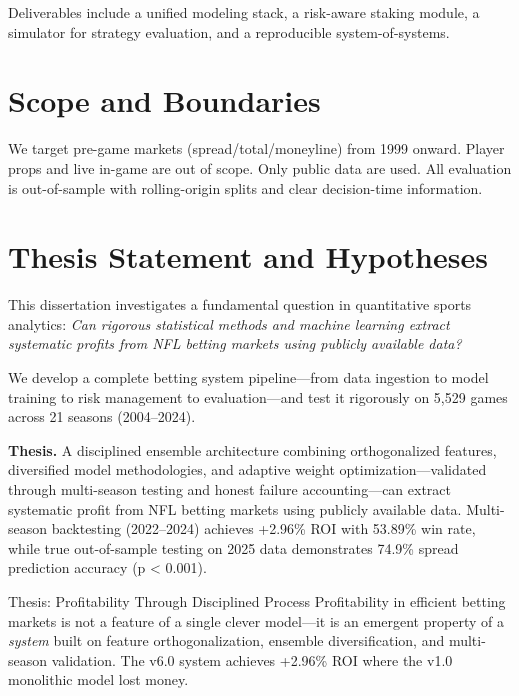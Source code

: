 \noindent Deliverables include a unified modeling stack, a risk-aware staking module, a simulator for strategy evaluation, and a reproducible system-of-systems.


\section{Scope and Boundaries}
We target pre-game markets (spread/total/moneyline) from 1999 onward. Player props and live in-game are out of scope. Only public data are used. All evaluation is out-of-sample with rolling-origin splits and clear decision-time information.

\section{Thesis Statement and Hypotheses}

This dissertation investigates a fundamental question in quantitative sports analytics: \textit{Can rigorous statistical methods and machine learning extract systematic profits from NFL betting markets using publicly available data?}

We develop a complete betting system pipeline—from data ingestion to model training to risk management to evaluation—and test it rigorously on 5,529 games across 21 seasons (2004--2024).

\textbf{Thesis.} A disciplined ensemble architecture combining orthogonalized features, diversified model methodologies, and adaptive weight optimization—validated through multi-season testing and honest failure accounting—can extract systematic profit from NFL betting markets using publicly available data. Multi-season backtesting (2022--2024) achieves +2.96\% ROI with 53.89\% win rate, while true out-of-sample testing on 2025 data demonstrates 74.9\% spread prediction accuracy (p < 0.001).

\begin{keyfinding}{Thesis: Profitability Through Disciplined Process}
Profitability in efficient betting markets is not a feature of a single clever model---it is an emergent property of a \emph{system} built on feature orthogonalization, ensemble diversification, and multi-season validation. The v6.0 system achieves +2.96\% ROI where the v1.0 monolithic model lost money.
\end{keyfinding}

